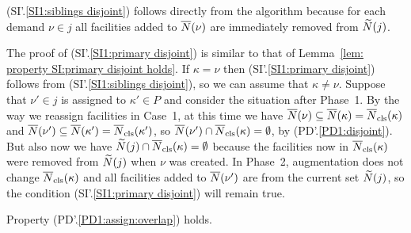 (SI'.\ref{SI1:siblings disjoint}) follows directly from the
algorithm because for each demand $\nu\in j$ all facilities added
to ${\overline{N}}(\nu)$ are immediately removed from ${\widetilde N}(j)$.

The proof of (SI'.\ref{SI1:primary disjoint}) is similar to
that of Lemma~\ref{lem: property SI:primary disjoint holds}. If $\kappa=\nu$
then (SI'.\ref{SI1:primary disjoint}) follows from (SI'.\ref{SI1:siblings disjoint}),
so we can assume that $\kappa\neq\nu$. 
Suppose that $\nu'\in j$ is assigned to $\kappa'\in P$ and consider the situation after
Phase~1. By the way we reassign facilities in Case~1, at this time we have
${\overline{N}}(\nu)\subseteq {\overline{N}}(\kappa) = {\overline{N}}_{\text{cls}}(\kappa)$ and 
${\overline{N}}(\nu')\subseteq {\overline{N}}(\kappa') ={\overline{N}}_{\text{cls}}(\kappa')$,
so ${\overline{N}}(\nu')\cap {\overline{N}}_{\text{cls}}(\kappa) = \emptyset$, by (PD'.\ref{PD1:disjoint}).
But also now we have ${\widetilde N}(j) \cap {\overline{N}}_{\text{cls}}(\kappa) = \emptyset$
because the facilities now in ${\overline{N}}_{\text{cls}}(\kappa)$ were removed from
${\widetilde N}(j)$ when $\nu$ was created. In Phase~2, augmentation does not change
${\overline{N}}_{\text{cls}}(\kappa)$ and all facilities added to ${\overline{N}}(\nu')$ are from
the current set ${\widetilde N}(j)$, so the condition (SI'.\ref{SI1:primary disjoint}) will remain true.


\begin{lemma} \label{lem: PD1: primary overlap}
  Property (PD'.\ref{PD1:assign:overlap}) holds.
\end{lemma}

